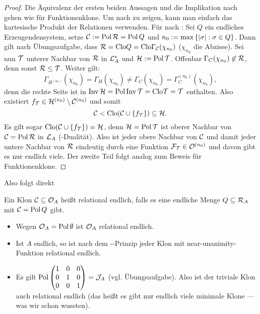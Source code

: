 \documentclass{book}
\begin{document}
\begin{proof}
    Die Äquivalenz der ersten beiden Aussagen und die Implikation  nach  gehen wie für Funktionenklone.
    Um  nach  zu zeigen, kann man einfach das kartesische Produkt der Relationen verwenden. Für  nach : Sei $Q$ ein endliches Erzeugendensystem, setze $\mathcal{C}:=\mathop\mathrm{Pol}\mathcal{R}=\mathop\mathrm{Pol} Q$ und $n_0:=\max\left\{\left|\sigma\right|:\sigma\in Q\right\}$. Dann gilt nach Übungsaufgabe, dass $\mathcal{R} = \mathrm{Clo} Q = \mathrm{Clo} \Gamma_{\mathcal{C}}(\chi_{n_0})$ ($\chi_{n_0}$ die Abzisse). Sei nun $\mathcal{T}$ unterer Nachbar von $\mathcal{R}$ in $\mathcal{L}^{\ast}_A$ und $\mathcal{H}:=\mathop\mathrm{Pol} \mathcal{T}$. Offenbar $\Gamma_C(\chi_{n_0})\not\in\mathcal{R}$, denn sonst $\mathcal{R}\leq \mathcal{T}$. Weiter gilt:
    $$
\Gamma_{H^{(n_0)}}(\chi_{n_0})=\Gamma_H(\chi_{n_0})\neq\Gamma_C(\chi_{n_0})=\Gamma_C^{(n_0)}(\chi_{n_0}),
$$
denn  die rechte Seite ist in $\mathop\mathrm{Inv}\mathcal{H}=\mathop\mathrm{Pol}\mathop\mathrm{Inv}\mathcal{T}=\mathrm{Clo} \mathcal{T}=\mathcal{T}$ enthalten. Also existiert $f_{\mathcal{T}}\in \mathcal{H}^{(n_0)}\setminus\mathcal{C}^{(n_0)}$ und somit
$$
\mathcal{C}<\mathrm{Clo}(\mathcal{C}\cup\left\{f_{\mathcal{T}}\right\})\subseteq \mathcal{H}.
    $$
    Es gilt sogar $\mathrm{Clo}(\mathcal{C}\cup\left\{f_{\mathcal{T}}\right\})=\mathcal{H}$, denn $\mathcal{H}=\mathop\mathrm{Pol}\mathcal{T}$ ist oberer Nachbar von $\mathcal{C}=\mathop\mathrm{Pol}\mathcal{R}$ in $\mathcal{L}_A$ (-Dualität).
    Also ist jeder obere Nachbar von $\mathcal{C}$ und damit jeder untere Nachbar von $\mathcal{R}$ eindeutig durch eine Funktion $\mathcal{F}_{\mathcal{T}}\in\mathcal{O}^{(n_0)}$ und davon gibt es nur endlich viele.
    Der zweite Teil folgt analog zum Beweis für Funktionenklone.
\end{proof}

Also folgt direkt

\begin{definition}
    Ein Klon $\mathcal{C}\subseteq \mathcal{O}_A$ heißt relational endlich, falls es eine endliche Menge $Q\subseteq \mathcal{R}_A$ mit $\mathcal{C}=\mathop\mathrm{Pol} Q$ gibt.
\end{definition}

\begin{example}
    \begin{itemize}
            \item Wegen $\mathcal{O}_A=\mathop\mathrm{Pol}\emptyset$ ist $\mathcal{O}_A$ relational endlich.
            \item Ist $A$ endlich, so ist nach dem --Prinzip jeder Klon mit near-unanimity-Funktion relational endlich.
            \item Es gilt $\mathop\mathrm{Pol}
        \begin{pmatrix}
            1 & 0 & 0\\
            0 & 1 & 0\\
            0 & 0 & 1
        \end{pmatrix}=\mathcal{J}_A$ (vgl. Übungsaufgabe). Also ist der triviale Klon auch relational endlich (das heißt es gibt nur endlich viele minimale Klone --- was wir schon wussten).
    \end{itemize}    
\end{example}
\end{document}
